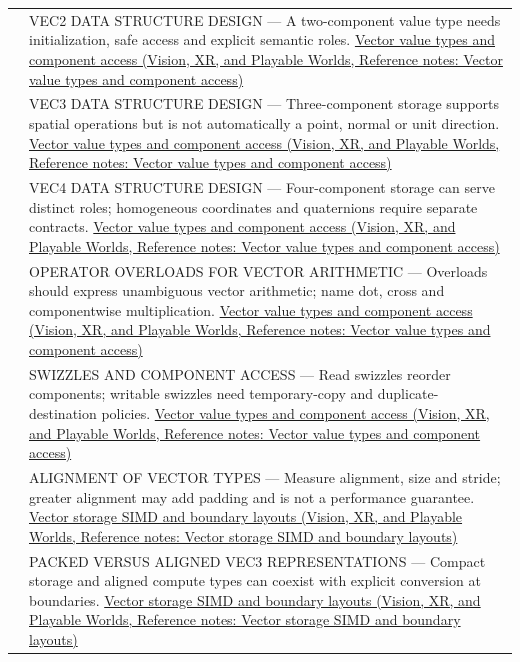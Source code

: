{\begin{longtable}[]{@{}
  >{\raggedright\arraybackslash}p{}
  >{\raggedright\arraybackslash}p{}@{}}
588 & VEC2 DATA STRUCTURE DESIGN --- A two-component value type needs initialization, safe access and explicit semantic roles. \href{../07-Vision-XR-and-Playable-Worlds/main.pdf\#nameddest=appendix-37a39984ba66}{Vector value types and component access (Vision, XR, and Playable Worlds, Reference notes: Vector value types and component access)} \\
589 & VEC3 DATA STRUCTURE DESIGN --- Three-component storage supports spatial operations but is not automatically a point, normal or unit direction. \href{../07-Vision-XR-and-Playable-Worlds/main.pdf\#nameddest=appendix-37a39984ba66}{Vector value types and component access (Vision, XR, and Playable Worlds, Reference notes: Vector value types and component access)} \\
590 & VEC4 DATA STRUCTURE DESIGN --- Four-component storage can serve distinct roles; homogeneous coordinates and quaternions require separate contracts. \href{../07-Vision-XR-and-Playable-Worlds/main.pdf\#nameddest=appendix-37a39984ba66}{Vector value types and component access (Vision, XR, and Playable Worlds, Reference notes: Vector value types and component access)} \\
591 & OPERATOR OVERLOADS FOR VECTOR ARITHMETIC --- Overloads should express unambiguous vector arithmetic; name dot, cross and componentwise multiplication. \href{../07-Vision-XR-and-Playable-Worlds/main.pdf\#nameddest=appendix-37a39984ba66}{Vector value types and component access (Vision, XR, and Playable Worlds, Reference notes: Vector value types and component access)} \\
592 & SWIZZLES AND COMPONENT ACCESS --- Read swizzles reorder components; writable swizzles need temporary-copy and duplicate-destination policies. \href{../07-Vision-XR-and-Playable-Worlds/main.pdf\#nameddest=appendix-37a39984ba66}{Vector value types and component access (Vision, XR, and Playable Worlds, Reference notes: Vector value types and component access)} \\
593 & ALIGNMENT OF VECTOR TYPES --- Measure alignment, size and stride; greater alignment may add padding and is not a performance guarantee. \href{../07-Vision-XR-and-Playable-Worlds/main.pdf\#nameddest=appendix-26bf6bf2fb8b}{Vector storage SIMD and boundary layouts (Vision, XR, and Playable Worlds, Reference notes: Vector storage SIMD and boundary layouts)} \\
594 & PACKED VERSUS ALIGNED VEC3 REPRESENTATIONS --- Compact storage and aligned compute types can coexist with explicit conversion at boundaries. \href{../07-Vision-XR-and-Playable-Worlds/main.pdf\#nameddest=appendix-26bf6bf2fb8b}{Vector storage SIMD and boundary layouts (Vision, XR, and Playable Worlds, Reference notes: Vector storage SIMD and boundary layouts)} \\

\end{longtable}}
